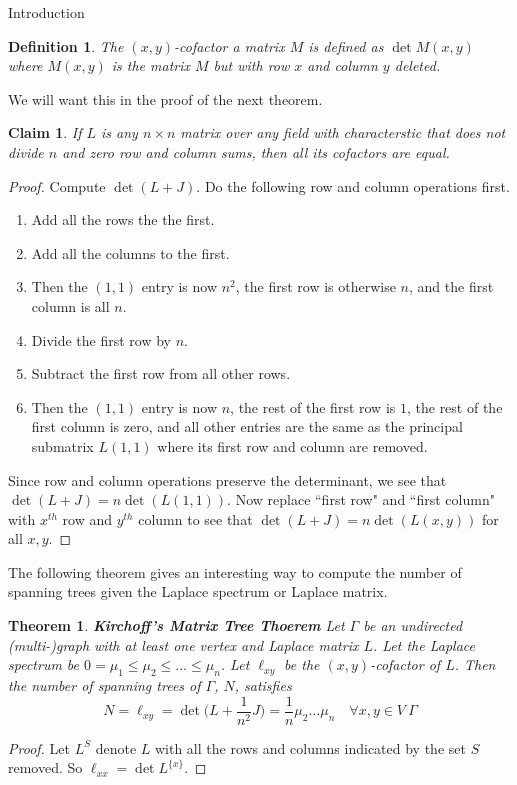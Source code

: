 \documentclass{article}
\newtheorem{claim}{Claim}
\newtheorem{thm}{Theorem}
\newtheorem{defn}{Definition}
\begin{document}
\begin{section}{Introduction}
  \begin{defn}
  The $(x,y)$-cofactor a matrix $M$ is defined as $\det M(x,y)$ where $M(x,y)$ is the matrix $M$ but with row $x$ and column $y$ deleted.
  \end{defn}

  We will want this in the proof of the next theorem.
  \begin{claim}\label{zero-sum-cofactors-equal}
    If $L$ is any $n\times n$ matrix over any field with characterstic that does not divide $n$ and zero row and column sums, then all its cofactors are equal.
  \end{claim}
  \begin{proof}
    Compute $\det(L + J)$.
    Do the following row and column operations first.
    \begin{enumerate}
      \item
	Add all the rows the the first.
      \item
	Add all the columns to the first.
      \item
	Then the $(1,1)$ entry is now $n^2$, the first row is otherwise $n$, and the first column is all $n$.
      \item
	Divide the first row by $n$.
      \item
	Subtract the first row from all other rows.
      \item
	Then the $(1,1)$ entry is now $n$, the rest of the first row is $1$, the rest of the first column is zero, and all other entries are the same as the principal submatrix $L(1,1)$ where its first row and column are removed.
    \end{enumerate}
    Since row and column operations preserve the determinant, we see that $\det(L + J) = n\det(L(1,1))$.
    Now replace ``first row" and ``first column" with $x^{th}$ row and $y^{th}$ column to see that $\det(L+J) = n\det(L(x,y))$ for all $x,y$.
  \end{proof}

  The following theorem gives an interesting way to compute the number of spanning trees given the Laplace spectrum or Laplace matrix.

  \begin{thm}{\textbf{Kirchoff's Matrix Tree Thoerem}}
    Let $\Gamma$ be an undirected (multi-)graph with at least one vertex and Laplace matrix $L$.
    Let the Laplace spectrum be $0 = \mu_1 \leq \mu_2 \leq \ldots \leq \mu_n$.
    Let $\ell_{xy}$ be the $(x,y)$-cofactor of $L$.
    Then the number of spanning trees of $\Gamma$, $N$, satisfies
    $$
    N = \ell_{xy} = \det\big(L + \frac{1}{n^2}J\big) = \frac{1}{n}\mu_2\hdots\mu_n \quad \forall x,y \in V~\Gamma
    $$
  \end{thm}
  \begin{proof}
    Let $L^S$ denote $L$ with all the rows and columns indicated by the set $S$ removed.
    So $\ell_{xx} = \det L^{\{x\}}$.


\end{proof}
\end{section}
\end{document}
